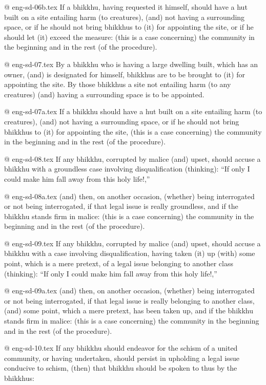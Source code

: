 @ eng-sd-06b.tex
If a bhikkhu, having requested it himself, should have a hut built on a site entailing harm (to creatures), (and) not having a surrounding space, or if he should not bring bhikkhus to (it) for appointing the site, or if he should let (it) exceed the measure: (this is a case concerning) the community in the beginning and in the rest (of the procedure).

@ eng-sd-07.tex
By a bhikkhu who is having a large dwelling built, which has an owner, (and) is designated for himself, bhikkhus are to be brought to (it) for appointing the site. By those bhikkhus a site not entailing harm (to any creatures) (and) having a surrounding space is to be appointed.

@ eng-sd-07a.tex
If a bhikkhu should have a hut built on a site entailing harm (to creatures), (and) not having a surrounding space, or if he should not bring bhikkhus to (it) for appointing the site, (this is a case concerning) the community in the beginning and in the rest (of the procedure).

@ eng-sd-08.tex
If any bhikkhu, corrupted by malice (and) upset, should accuse a bhikkhu with a groundless case involving disqualification (thinking): “If only I could make him fall away from this holy life!,”

@ eng-sd-08a.tex
(and) then, on another occasion, (whether) being interrogated or not being interrogated, if that legal issue is really groundless, and if the bhikkhu stands firm in malice: (this is a case concerning) the community in the beginning and in the rest (of the procedure).

@ eng-sd-09.tex
If any bhikkhu, corrupted by malice (and) upset, should accuse a bhikkhu with a case involving disqualification, having taken (it) up (with) some point, which is a mere pretext, of a legal issue belonging to another class (thinking): “If only I could make him fall away from this holy life!,”

@ eng-sd-09a.tex
(and) then, on another occasion, (whether) being interrogated or not being interrogated, if that legal issue is really belonging to another class, (and) some point, which a mere pretext, has been taken up, and if the bhikkhu stands firm in malice: (this is a case concerning) the community in the beginning and in the rest (of the procedure).

@ eng-sd-10.tex
If any bhikkhu should endeavor for the schism of a united community, or having undertaken, should persist in upholding a legal issue conducive to schism, (then) that bhikkhu should be spoken to thus by the bhikkhus:

